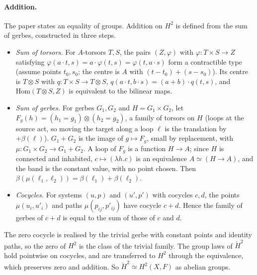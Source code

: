 \documentclass[11pt]{article}
\theoremstyle{remark}
\begin{document}
\paragraph{Addition.} The paper states an equality of groups. Addition
on $H^2$ is defined from the sum of gerbes, constructed in three steps.
\begin{itemize}
\item \emph{Sum of torsors.} For $A$-torsors $T,S$, the pairs $(Z,\varphi)$
  with $\varphi:T\times S\to Z$ satisfying
  $\varphi(a\cdot t,s)=a\cdot\varphi(t,s)=\varphi(t,a\cdot s)$ form a
  contractible type (assume points $t_0,s_0$; the centre is $A$ with
  $(t-t_0)+(s-s_0)$). Its centre is $T\otimes S$ with
  $q:T\times S\to T\otimes S$, $q(a\cdot t,b\cdot s)=(a+b)\cdot q(t,s)$,
  and $\mathrm{Hom}(T\otimes S,Z)$ is equivalent to the bilinear maps.
\item \emph{Sum of gerbes.} For gerbes $G_1,G_2$ and $H=G_1\times G_2$, let
  $F_g(h)=(h_1=g_1)\otimes(h_2=g_2)$, a family of torsors on $H$ (loops at
  the source act, so moving the target along a loop $\ell$ is the
  translation by $+\beta(\ell)$). $G_1+G_2$ is the image of
  $g\mapsto F_g$, small by replacement, with $\mu:G_1\times G_2\to G_1+G_2$.
  A loop of $F_g$ is a function $H\to A$; since $H$ is connected and
  inhabited, $c\mapsto(\lambda h.c)$ is an equivalence $A\simeq(H\to A)$,
  and the band is the constant value, with no point chosen. Then
  $\beta(\mu(\ell_1,\ell_2))=\beta(\ell_1)+\beta(\ell_2)$.
\item \emph{Cocycles.} For systems $(u,p)$ and $(u',p')$ with cocycles
  $c,d$, the points $\mu(u_i,u'_i)$ and paths $\mu(p_{ij},p'_{ij})$ have
  cocycle $c+d$. Hence the family of gerbes of $c+d$ is equal to the sum
  of those of $c$ and $d$.
\end{itemize}
The zero cocycle is realised by the trivial gerbe with constant points
and identity paths, so the zero of $H^2$ is the class of the trivial
family. The group laws of $\check H^2$ hold pointwise on cocycles, and
are transferred to $H^2$ through the equivalence, which preserves zero
and addition. So $\check H^2\simeq H^2(X,F)$ as abelian groups.
\end{document}
